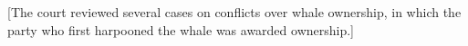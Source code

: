 %
%

[The court reviewed several cases on conflicts over whale ownership, in
which the party who first harpooned the whale was awarded ownership.]

